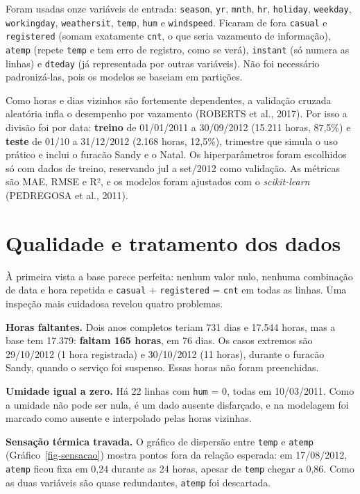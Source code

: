 \documentclass[
  portuguese,
  10pt,
  a4paper,
]{article}
\begin{document}
Foram usadas onze variáveis de entrada: \texttt{season}, \texttt{yr},
\texttt{mnth}, \texttt{hr}, \texttt{holiday}, \texttt{weekday},
\texttt{workingday}, \texttt{weathersit}, \texttt{temp}, \texttt{hum} e
\texttt{windspeed}. Ficaram de fora \texttt{casual} e
\texttt{registered} (somam exatamente \texttt{cnt}, o que seria
vazamento de informação), \texttt{atemp} (repete \texttt{temp} e tem
erro de registro, como se verá), \texttt{instant} (só numera as linhas)
e \texttt{dteday} (já representada por outras variáveis). Não foi
necessário padronizá-las, pois os modelos se baseiam em partições.

Como horas e dias vizinhos são fortemente dependentes, a validação
cruzada aleatória infla o desempenho por vazamento (ROBERTS et al.,
2017). Por isso a divisão foi por data: \textbf{treino} de 01/01/2011 a
30/09/2012 (15.211 horas, 87,5\%) e \textbf{teste} de 01/10 a 31/12/2012
(2.168 horas, 12,5\%), trimestre que simula o uso prático e inclui o
furacão Sandy e o Natal. Os hiperparâmetros foram escolhidos só com
dados de treino, reservando jul a set/2012 como validação. As métricas
são MAE, RMSE e R², e os modelos foram ajustados com o
\emph{scikit-learn} (PEDREGOSA et al., 2011).

\section{Qualidade e tratamento dos
dados}\label{qualidade-e-tratamento-dos-dados}

À primeira vista a base parece perfeita: nenhum valor nulo, nenhuma
combinação de data e hora repetida e \texttt{casual} +
\texttt{registered} = \texttt{cnt} em todas as linhas. Uma inspeção mais
cuidadosa revelou quatro problemas.

\textbf{Horas faltantes.} Dois anos completos teriam 731 dias e 17.544
horas, mas a base tem 17.379: \textbf{faltam 165 horas}, em 76 dias. Os
casos extremos são 29/10/2012 (1 hora registrada) e 30/10/2012 (11
horas), durante o furacão Sandy, quando o serviço foi suspenso. Essas
horas não foram preenchidas.

\textbf{Umidade igual a zero.} Há 22 linhas com \texttt{hum} = 0, todas
em 10/03/2011. Como a umidade não pode ser nula, é um dado ausente
disfarçado, e na modelagem foi marcado como ausente e interpolado pelas
horas vizinhas.

\textbf{Sensação térmica travada.} O gráfico de dispersão entre
\texttt{temp} e \texttt{atemp} (Gráfico~\ref{fig-sensacao}) mostra
pontos fora da relação esperada: em 17/08/2012, \texttt{atemp} ficou
fixa em 0,24 durante as 24 horas, apesar de \texttt{temp} chegar a 0,86.
Como as duas variáveis são quase redundantes, \texttt{atemp} foi
descartada.
\end{document}
